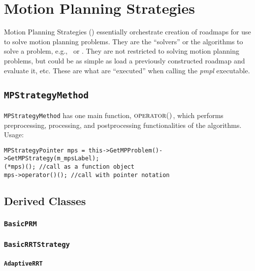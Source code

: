 \chapter{Motion Planning Strategies}

Motion Planning Strategies (\mps) essentially orchestrate creation of roadmaps
for use to solve motion planning problems. They are the ``solvers'' or the
algorithms to solve a problem, e.g., \prm\ or \rrt. They are not restricted to
solving motion planning problems, but could be as simple as load a previously
constructed roadmap and evaluate it, etc. These are what are ``executed'' when
calling the \textit{pmpl} executable.

\section{\texttt{MPStrategyMethod}}

\texttt{MPStrategyMethod} has one main function, $\textsc{operator()}$, which
performs preprocessing, processing, and postprocessing functionalities of the
algorithms. Usage:
\begin{lstlisting}
MPStrategyPointer mps = this->GetMPProblem()->GetMPStrategy(m_mpsLabel);
(*mps)(); //call as a function object
mps->operator()(); //call with pointer notation
\end{lstlisting}

\section{Derived Classes}

\subsection{\texttt{BasicPRM}}

\subsection{\texttt{BasicRRTStrategy}}

\subsubsection{\texttt{AdaptiveRRT}}

